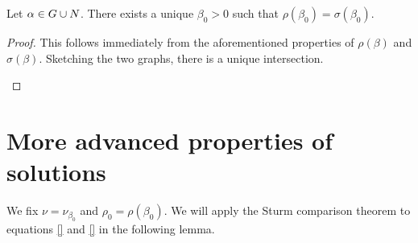 \begin{lemma}\label{genlem5}
Let $\alpha\in G\cup N$. There exists a unique $\beta_0 > 0$ such that $\rho \left(
\beta_0 \right) = \sigma \left( \beta_0 \right)$.
\end{lemma}
\begin{proof}
This follows immediately from the {\red aforementioned} properties of $\rho(\beta)$ and
$\sigma(\beta)$. Sketching the two graphs, there is a unique
intersection.\hfill\\

\begin{centering}
\end{centering} 
\end{proof}

\section{More advanced properties of solutions}
We fix $\nu = \nu_{\beta_0}$ and $\rho_0 = \rho \left( \beta_0 \right)$. We will
apply the Sturm comparison theorem to equations \eqref{} and \eqref{} in the 
following lemma.

